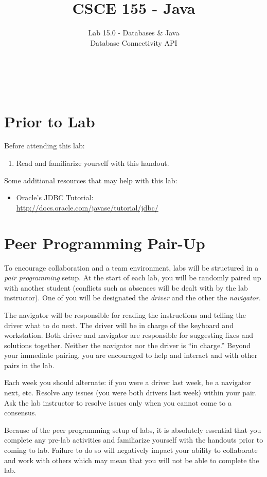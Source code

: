 \documentclass[12pt]{scrartcl}
\title{CSCE 155 - Java}
\subtitle{Lab 15.0 - Databases \& Java \\Database Connectivity API}
\author{~}
\date{~}
\begin{document}
\maketitle

\section*{Prior to Lab}

Before attending this lab:
\begin{enumerate}
  \item Read and familiarize yourself with this handout.
\end{enumerate}

Some additional resources that may help with this lab:
\begin{itemize}
  \item Oracle's JDBC Tutorial: \\
  	\url{http://docs.oracle.com/javase/tutorial/jdbc/}
\end{itemize}

\section*{Peer Programming Pair-Up}

To encourage collaboration and a team environment, labs will be
structured in a \emph{pair programming} setup.  At the start of
each lab, you will be randomly paired up with another student 
(conflicts such as absences will be dealt with by the lab instructor).
One of you will be designated the \emph{driver} and the other
the \emph{navigator}.  

The navigator will be responsible for reading the instructions and
telling the driver what to do next.  The driver will be in charge of the
keyboard and workstation.  Both driver and navigator are responsible
for suggesting fixes and solutions together.  Neither the navigator
nor the driver is ``in charge.''  Beyond your immediate pairing, you
are encouraged to help and interact and with other pairs in the lab.

Each week you should alternate: if you were a driver last week, 
be a navigator next, etc.  Resolve any issues (you were both drivers
last week) within your pair.  Ask the lab instructor to resolve issues
only when you cannot come to a consensus.  

Because of the peer programming setup of labs, it is absolutely 
essential that you complete any pre-lab activities and familiarize
yourself with the handouts prior to coming to lab.  Failure to do
so will negatively impact your ability to collaborate and work with 
others which may mean that you will not be able to complete the
lab.  
\end{document}
